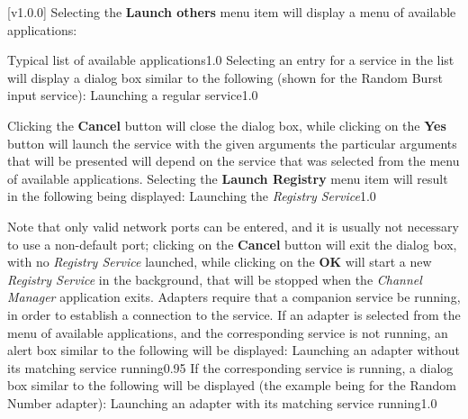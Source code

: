 [v1.0.0]
Selecting the \textbf{Launch others \textellipsis} menu item will display a menu of
available applications:

%
{Typical list of available applications}{1.0}
\condPage{}
Selecting an entry for a service in the list will display a dialog box similar to the
following (shown for the Random Burst input service):
%
{Launching a regular service}{1.0}

Clicking the \textbf{Cancel} button will close the dialog box, while clicking on the
\textbf{Yes} button will launch the service with the given arguments \longDash{} the
particular arguments that will be presented will depend on the service that was selected
from the menu of available applications.
\secondaryEnd
\condPage
{}
Selecting the \textbf{Launch Registry} menu item will result in the following being
displayed:
%
{Launching the \emph{Registry Service}}{1.0}

Note that only valid network ports can be entered, and it is usually not necessary to use
a non-default port; clicking on the \textbf{Cancel} button will exit the dialog box, with
no \emph{Registry Service} launched, while clicking on the \textbf{OK} will start a new
\emph{Registry Service} in the background, that will be stopped when the
\emph{Channel Manager} application exits.
\secondaryEnd
{}
Adapters require that a companion service be running, in order to establish a connection
to the service.
If an adapter is selected from the menu of available applications, and the corresponding
service is not running, an alert box similar to the following will be displayed:
%
{Launching an adapter without its matching service running}{0.95}
\condPage{}
If the corresponding service is running, a dialog box similar to the following will be
displayed (the example being for the Random Number adapter):
%
{Launching an adapter with its matching service running}{1.0}

